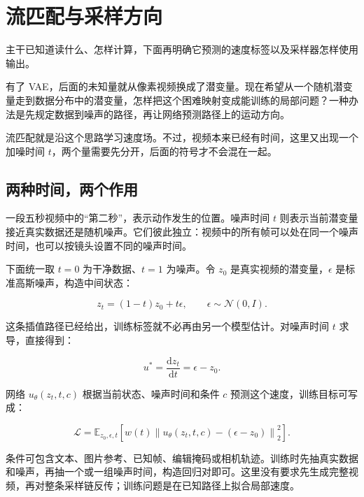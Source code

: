 \chapter{流匹配与采样方向}\label{seedance-m02}

主干已知道读什么、怎样计算，下面再明确它预测的速度标签以及采样器怎样使用输出。

有了 VAE，后面的未知量就从像素视频换成了潜变量。现在希望从一个随机潜变量走到数据分布中的潜变量，怎样把这个困难映射变成能训练的局部问题？一种办法是先规定数据到噪声的路径，再让网络预测路径上的运动方向。

流匹配就是沿这个思路学习速度场。不过，视频本来已经有时间，这里又出现一个加噪时间 \(t\)，两个量需要先分开，后面的符号才不会混在一起。

\section{两种时间，两个作用}\label{seedance-m02-ux4e24ux79cdux65f6ux95f4ux4e24ux4e2aux4f5cux7528}

一段五秒视频中的``第二秒''，表示动作发生的位置。噪声时间 \(t\) 则表示当前潜变量接近真实数据还是随机噪声。它们彼此独立：视频中的所有帧可以处在同一个噪声时间，也可以按镜头设置不同的噪声时间。

下面统一取 \(t=0\) 为干净数据、\(t=1\) 为噪声。令 \(z_0\) 是真实视频的潜变量，\(\epsilon\) 是标准高斯噪声，构造中间状态：

\[
z_t=(1-t)z_0+t\epsilon,\qquad \epsilon\sim\mathcal{N}(0,I).
\]

这条插值路径已经给出，训练标签就不必再由另一个模型估计。对噪声时间 \(t\) 求导，直接得到：

\[
u^*=\frac{\mathrm{d}z_t}{\mathrm{d}t}=\epsilon-z_0.
\]

网络 \(u_\theta(z_t,t,c)\) 根据当前状态、噪声时间和条件 \(c\) 预测这个速度，训练目标可写成：

\[
\mathcal{L}=\mathbb{E}_{z_0,\epsilon,t}
\left[w(t)\left\lVert u_\theta(z_t,t,c)-(\epsilon-z_0)\right\rVert_2^2\right].
\]

条件可包含文本、图片参考、已知帧、编辑掩码或相机轨迹。训练时先抽真实数据和噪声，再抽一个或一组噪声时间，构造回归对即可。这里没有要求先生成完整视频，再对整条采样链反传；训练问题是在已知路径上拟合局部速度。

